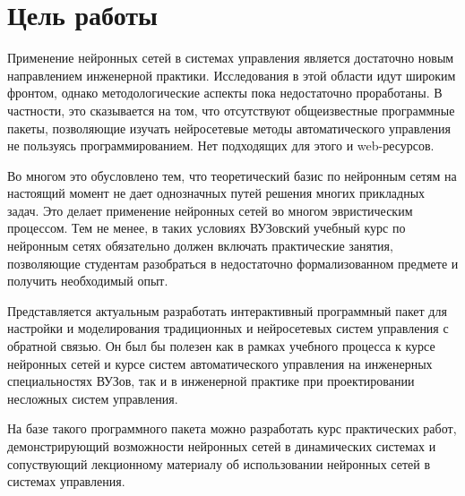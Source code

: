 

\section{Цель работы}

Применение нейронных сетей в системах управления является достаточно
новым направлением инженерной практики.  Исследования в этой области
идут широким фронтом, однако методологические аспекты пока
недостаточно проработаны.  В частности, это сказывается на том, что
отсутствуют общеизвестные программные пакеты, позволяющие изучать
нейросетевые методы автоматического управления не пользуясь
программированием.  Нет подходящих для этого и web-ресурсов.

Во многом это обусловлено тем, что теоретический базис по нейронным
сетям на настоящий момент не дает однозначных путей решения многих
прикладных задач.  Это делает применение нейронных сетей во многом
эвристическим процессом.  Тем не менее, в таких условиях ВУЗовский
учебный курс по нейронным сетях обязательно должен включать
практические занятия, позволяющие студентам разобраться в недостаточно
формализованном предмете и получить необходимый опыт.

Представляется актуальным разработать интерактивный программный пакет
для настройки и моделирования традиционных и нейросетевых систем
управления с обратной связью.  Он был бы полезен как в рамках учебного
процесса к курсе нейронных сетей и курсе систем автоматического
управления на инженерных специальностях ВУЗов, так и в инженерной
практике при проектировании несложных систем управления.

На базе такого программного пакета можно разработать курс практических
работ, демонстрирующий возможности нейронных сетей в динамических
системах и сопуствующий лекционному материалу об использовании
нейронных сетей в системах управления.

